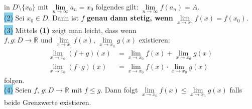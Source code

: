 \documentclass[landscape, 10pt]{article}
\newcommand{\R}{\mathbb{R}}
\begin{document}
\begin{multicols}{3}
                            in \textcolor{NavyBlue}{
                            $D\setminus\{x_0\}$} mit 
                            \textcolor{NavyBlue}{
                            $\lim\limits_{n\to\infty}a_n=x_0$} 
                            folgendes gilt: 
                            \textcolor{NavyBlue}{
                            $\lim\limits_{n\to\infty}f(a_n)=A$}.\\ 
                     \colorbox{SkyBlue}{(2)}
                            Sei \textcolor{NavyBlue}{$x_0\in D$}. 
                            Dann ist \textcolor{NavyBlue}{$f$} 
                            \textbf{genau dann stetig, wenn} 
                            \textcolor{NavyBlue}{
                            $\lim\limits_{x\to x_0}f(x)=f(x_0)$}.\\
                     \colorbox{SkyBlue}{(3)} 
                            Mittels \textbf{(1)} zeigt man leicht, 
                            dass wenn \\
                            \textcolor{NavyBlue}{
                            $f,g:D\longrightarrow\R$} 
                            und 
                            \textcolor{NavyBlue}{
                            $\lim\limits_{x\to x_)}f(x)$},
                            \textcolor{NavyBlue}{
                            $\lim\limits_{x\to x_0}g(x)$}
                            existieren: 
                            \begin{align*}
                                   \lim\limits_{x\to x_0}(f+g)(x)
                                   &=\lim\limits_{x\to x_0}f(x)
                                   +\lim\limits_{x\to x_0}g(x)\\
                                   \lim\limits_{x\to x_0}(f\cdot g)(x)
                                   &=\lim\limits_{x\to x_0}f(x)
                                   \cdot\lim\limits_{x\to x_0}g(x)
                            \end{align*}
                            folgen.\\
                     \colorbox{SkyBlue}{(4)} 
                            Seien \textcolor{NavyBlue}{$f$},
                            \textcolor{NavyBlue}{
                            $g:D\longrightarrow\R$} mit 
                            \textcolor{NavyBlue}{
                            $f\leqslant g$}. Dann folgt 
                            \textcolor{NavyBlue}{
                            $\lim\limits_{x\to x_0}f(x)
                            \leqslant\lim\limits_{x\to x_0}g(x)$}
                            falls beide Grenzwerte existieren.\\

\end{multicols}
\end{document}
